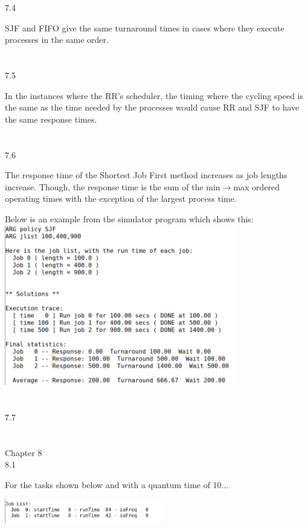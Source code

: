 \documentclass[12pt, a4paper]{article}
\begin{document}
7.4

SJF and FIFO give the same turnaround times in cases where they execute processes in the same order.\\ \\ \\

7.5

In the instances where the RR's scheduler, the timing where the cycling speed is the same as the time needed by the processes would cause RR and SJF to have the same response times.\\ \\ \\

7.6

The response time of the Shortest Job First method increases as job lengths increase. Though, the response time is the sum of the min\(\rightarrow\)max ordered operating times with the exception of the largest process time. 

Below is an example from the simulator program which shows this: \\ 

\includegraphics[height=7cm]{hw2_7_6.png} \\ \\ \\

7.7 \\ \\ \\

\noindent
Chapter 8\\

8.1

For the tasks shown below and with a quantum time of 10...

\includegraphics[width=7cm]{hw2_8_1.png} 
\end{document}
